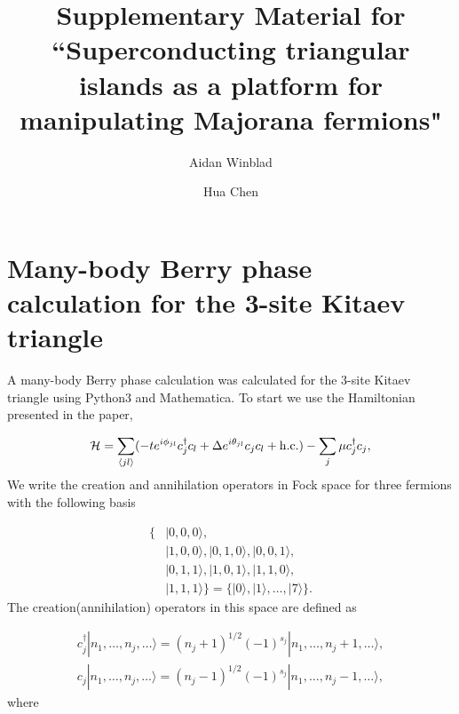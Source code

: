 \documentclass[aps,prb,showpacs,amsmath,amssymb,superscriptaddress]{revtex4-2}
\newcommand{\ham}{\mathcal{H}}
\newcommand{\cc}{c^{\dagger}}
\newcommand{\de}{\Delta}
\begin{document}
\title{Supplementary Material for ``Superconducting triangular islands as a platform for manipulating Majorana fermions"}

\author{Aidan Winblad}

\author{Hua Chen}

\maketitle

\section{Many-body Berry phase calculation for the 3-site Kitaev triangle}

A many-body Berry phase calculation was calculated for the 3-site Kitaev triangle using Python3 and Mathematica.
To start we use the Hamiltonian presented in the paper,

\begin{equation}\label{eq:HBdG}
  \ham = \sum_{\langle j l \rangle} (-te^{i\phi_{jl}}\cc_{j} c_l + \de e^{i\theta_{jl}} c_{j} c_l + {\rm h.c.}) - \sum_{j} \mu \cc_j c_j,
\end{equation}
We write the creation and annihilation operators in Fock space for three fermions with the following basis

\begin{align*}
  \{&|0,0,0 \rangle, \\
  &|1,0,0 \rangle, |0,1,0 \rangle, |0,0,1 \rangle, \\
  &|0,1,1 \rangle, |1,0,1 \rangle, |1,1,0 \rangle, \\
  &|1,1,1 \rangle\} = \{|0\rangle, |1\rangle, \dots, |7\rangle\}.
\end{align*}
The creation(annihilation) operators in this space are defined as

\begin{align}
  \cc_j |n_1,\dots,n_j, \dots\rangle = (n_j+1)^{1/2}(-1)^{s_j}|n_1,\dots,n_j+1,\dots\rangle, \\
  c_j |n_1,\dots,n_j, \dots\rangle = (n_j-1)^{1/2}(-1)^{s_j}|n_1,\dots,n_j-1,\dots\rangle,
\end{align}
where
\end{document}
